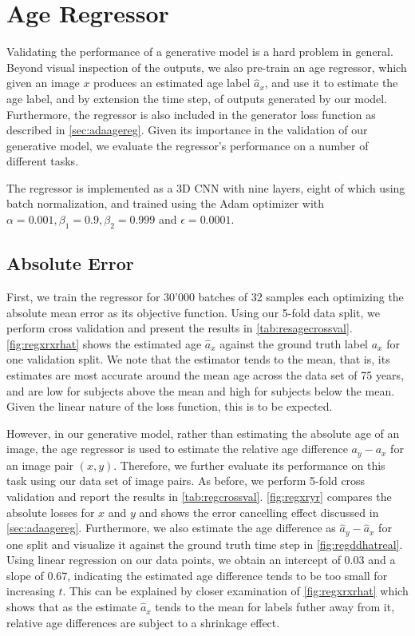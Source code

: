 \section{Age Regressor} \label{sec:expagereg}
Validating the performance of a generative model is a hard problem in general. Beyond visual inspection of the outputs, we also pre-train an age regressor, which given an image $x$ produces an estimated age label $\hat a_x$, and use it to estimate the age label, and by extension the time step, of outputs generated by our model. Furthermore, the regressor is also included in the generator loss function as described in \autoref{sec:adaagereg}. Given its importance in the validation of our generative model, we evaluate the regressor's performance on a number of different tasks.

The regressor is implemented as a 3D CNN with nine layers, eight of which using batch normalization, and trained using the Adam optimizer with $\alpha = 0.001, \beta_1 = 0.9, \beta_2 = 0.999 $ and $ \epsilon = 0.0001 $.

\subsection*{Absolute Error}
First, we train the regressor for 30'000 batches of 32 samples each optimizing the absolute mean error as its objective function. Using our 5-fold data split, we perform cross validation and present the results in \autoref{tab:resagecrossval}. \autoref{fig:regxrxrhat} shows the estimated age $ \hat a_x $ against the ground truth label $a_x$ for one validation split. We note that the estimator tends to the mean, that is, its estimates are most accurate around the mean age across the data set of 75 years, and are low for subjects above the mean and high for subjects below the mean. Given the linear nature of the loss function, this is to be expected.

However, in our generative model, rather than estimating the absolute age of an image, the age regressor is used to estimate the relative age difference $a_y - a_x$ for an image pair $(x, y)$. Therefore, we further evaluate its performance on this task using our data set of image pairs. As before, we perform 5-fold cross validation and report the results in \autoref{tab:regcrossval}. \autoref{fig:regxryr} compares the absolute losses for $x$ and $y$ and shows the error cancelling effect discussed in \autoref{sec:adaagereg}. Furthermore, we also estimate the age difference as $\hat a_y - \hat a_x$ for one split and visualize it against the ground truth time step in \autoref{fig:regddhatreal}. Using linear regression on our data points, we obtain an intercept of 0.03 and a slope of 0.67, indicating the estimated age difference tends to be too small for increasing $t$. This can be explained by closer examination of \autoref{fig:regxrxrhat} which shows that as the estimate $\hat a_x$ tends to the mean for labels futher away from it, relative age differences are subject to a shrinkage effect. 

